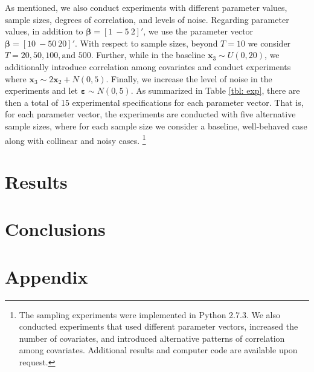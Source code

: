 \documentclass[english]{article}
\begin{document}
As mentioned, we also conduct experiments with different parameter 
values, sample sizes, degrees of correlation, and levels of noise. 
Regarding parameter values, in addition to $\mathbf{\beta}=[1 ~ -5 ~ 2]'$, 
we use the parameter vector $\mathbf{\beta}=[10 ~ -50 ~ 20]'$. 
With respect to sample sizes, beyond $T=10$ we consider $T=20, 50, 100, 
\text{and } 500$. 
Further, while in the baseline $\mathbf{x}_3 \sim U(0, 20)$, we 
additionally introduce correlation among covariates and conduct 
experiments where $\mathbf{x}_3 \sim 2 \mathbf{x}_2 + N(0, 5)$.
Finally, we increase the level of noise in the experiments and let 
$\mathbf{\varepsilon}\sim N(0,5)$.
As summarized in Table \ref{tbl: exp}, there are then a total of 15 
experimental specifications for each parameter vector. 
That is, for each parameter vector, the experiments are conducted with 
five alternative sample sizes, where for each sample size we consider 
a baseline, well-behaved case along with collinear and noisy cases.%
\footnote{The sampling experiments were implemented in Python 
2.7.3. 
We also conducted experiments that used different parameter vectors, 
increased the number of covariates, and introduced alternative patterns of 
correlation among covariates.
Additional results and computer code are available upon request.}


\section{Results}
\label{sec: results}


\section{Conclusions}
\label{sec: conc}


\newpage
\section*{Appendix}
\label{sec: appendix}
\end{document}
